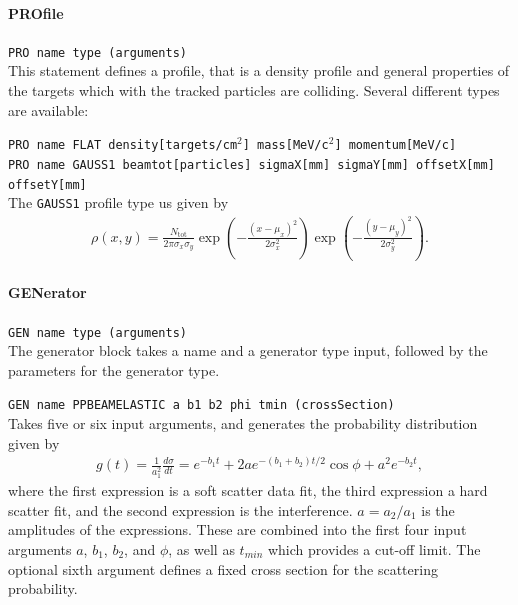 \paragraph{PROfile} \texttt{PRO name type (arguments)} \\

This statement defines a profile, that is a density profile and general properties of the targets which with the tracked particles are colliding.
Several different types are available:

\bigskip
\noindent\texttt{PRO name FLAT density[targets/cm$^2$] mass[MeV/c$^2$] momentum[MeV/c]}\\

\bigskip
\noindent\texttt{PRO name GAUSS1 beamtot[particles] sigmaX[mm] sigmaY[mm] offsetX[mm] offsetY[mm]} \\

The \texttt{GAUSS1} profile type us given by
\begin{align}
    \rho(x,y) = \frac{N_{\mathrm{tot}}}{2\pi\sigma_x\sigma_y}
                \exp\left(-\frac{(x-\mu_x)^2}{2\sigma_x^2}\right)
                \exp\left(-\frac{(y-\mu_y)^2}{2\sigma_y^2}\right).
\end{align}

\paragraph{GENerator} \texttt{GEN name type (arguments)} \\

The generator block takes a name and a generator type input, followed by the parameters for the
generator type.

\bigskip
\noindent\texttt{GEN name PPBEAMELASTIC a b1 b2 phi tmin (crossSection)} \\

Takes five or six input arguments, and generates the probability distribution given by
\begin{align}
    g(t) = \frac{1}{a_1^2}\frac{d\sigma}{dt} = e^{-b_1 t}+ 2ae^{-(b_1+b_2)t/2}\cos{\phi} + a^2e^{-b_2 t},
\end{align}
where the first expression is a soft scatter data fit, the third expression a hard scatter fit, and the second expression is the interference. $a = a_2/a_1$ is the amplitudes of the expressions.
These are combined into the first four input arguments $a$, $b_1$, $b_2$, and $\phi$, as well as $t_{min}$ which provides a cut-off limit.
The optional sixth argument defines a fixed cross section for the scattering probability.

